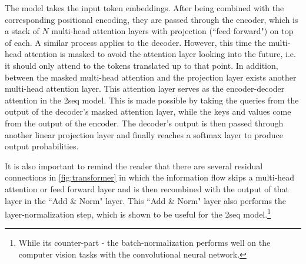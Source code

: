 The model takes the input token embeddings. After being combined with the corresponding positional encoding, they are passed through the encoder, which is a stack of $N$ multi-head attention layers with projection (``feed forward") on top of each.
A similar process applies to the decoder. However, this time the multi-head attention is masked to avoid the attention layer looking into the future, i.e. it should only attend to the tokens translated up to that point.
In addition, between the masked multi-head attention and the projection layer exists another multi-head attention layer. 
This attention layer serves as the encoder-decoder attention in the \seq2seq model.
This is made possible by taking the queries from the output of the decoder's masked attention layer, while the keys and values come from the output of the encoder.
The decoder's output is then passed through another linear projection layer and finally reaches a softmax layer to produce output probabilities.

It is also important to remind the reader that there are several residual connections in \cref{fig:transformer} in which the information flow skips a multi-head attention or feed forward layer and is then recombined with the output of that layer in the ``Add \& Norm" layer.
This ``Add \& Norm" layer also performs the layer-normalization step, which is shown to be useful for the \seq2seq model.\footnote{While its counter-part - the batch-normalization performs well on the computer vision tasks with the convolutional neural network.}
